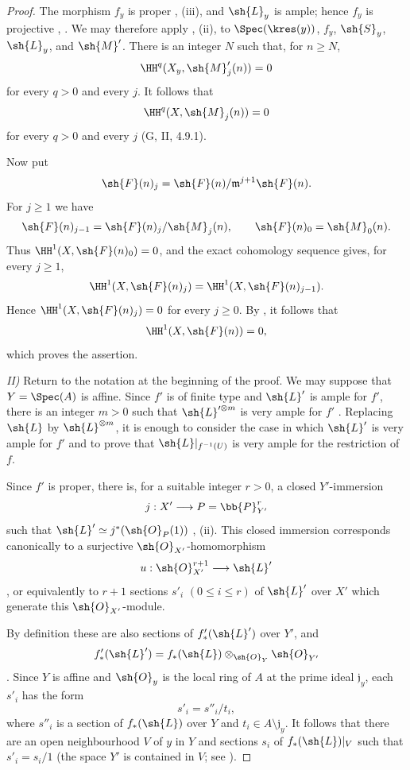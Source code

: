 \begin{proof}
The morphism $f_y$ is proper , (iii), and
$\sh{L}_y$ is ample; hence $f_y$ is projective
, .  We may therefore apply
, (ii), to
$\Spec(\kres(y))$, $f_y$, $\sh{S}_y$, $\sh{L}_y$, and $\sh{M}'$.
There is an integer $N$ such that, for $n\geq N$,
\[
  \HH^q(X_y,\sh{M}'_j(n))=0
\]
for every $q>0$ and every $j$.  It follows that
\[
  \HH^q(X,\sh{M}_j(n))=0
\]
for every $q>0$ and every $j$ (G, II, 4.9.1).

Now put
\[
  \sh{F}(n)_j
  =
  \sh{F}(n)/\mathfrak m^{j+1}\sh{F}(n).
\]
For $j\geq1$ we have
\[
  \sh{F}(n)_{j-1}
  =
  \sh{F}(n)_j/\sh{M}_j(n),
  \qquad
  \sh{F}(n)_0=\sh{M}_0(n).
\]
Thus $\HH^1(X,\sh{F}(n)_0)=0$, and the exact cohomology sequence
gives, for every $j\geq1$,
\[
  \HH^1(X,\sh{F}(n)_j)
  =
  \HH^1(X,\sh{F}(n)_{j-1}).
\]
Hence $\HH^1(X,\sh{F}(n)_j)=0$ for every $j\geq0$.  By
, it follows that
\[
  \HH^1(X,\sh{F}(n))=0,
\]
which proves the assertion.


\noindent\textit{II)} Return to the notation at the beginning of
the proof.  We may suppose that $Y=\Spec(A)$ is affine.  Since
$f'$ is of finite type and $\sh{L}'$ is ample for $f'$, there is an
integer $m>0$ such that $\sh{L}'^{\otimes m}$ is very ample for
$f'$ .  Replacing $\sh{L}$ by
$\sh{L}^{\otimes m}$, it is enough to consider the case in which
$\sh{L}'$ is very ample for $f'$ and to prove that
$\sh{L}|_{f^{-1}(U)}$ is very ample for the restriction of $f$.

Since $f'$ is proper, there is, for a suitable integer $r>0$, a
closed $Y'$-immersion
\[
  j:X'\longrightarrow P=\bb{P}_{Y'}^r
\]
such that $\sh{L}'\simeq j^*(\sh{O}_P(1))$
, (ii).  This closed immersion corresponds
canonically to a surjective $\sh{O}_{X'}$-homomorphism
\[
  u:\sh{O}_{X'}^{r+1}\longrightarrow\sh{L}'
\]
, or equivalently  to
$r+1$ sections $s'_i$ $(0\leq i\leq r)$ of $\sh{L}'$ over $X'$
which generate this $\sh{O}_{X'}$-module.

By definition these are also sections of $f'_*(\sh{L}')$ over
$Y'$, and
\[
  f'_*(\sh{L}')
  =
  f_*(\sh{L})\otimes_{\sh{O}_Y}\sh{O}_{Y'}
\]
.  Since $Y$ is affine and $\sh{O}_y$ is the
local ring of $A$ at the prime ideal $\mathfrak j_y$, each $s'_i$
has the form
\[
  s'_i=s''_i/t_i,
\]
where $s''_i$ is a section of $f_*(\sh{L})$ over $Y$ and
$t_i\in A\setminus\mathfrak j_y$.  It follows that there are an
open neighbourhood $V$ of $y$ in $Y$ and sections $s_i$ of
$f_*(\sh{L})|_V$ such that $s'_i=s_i/1$ (the space $Y'$ is
contained in $V$; see ).


\end{proof}
